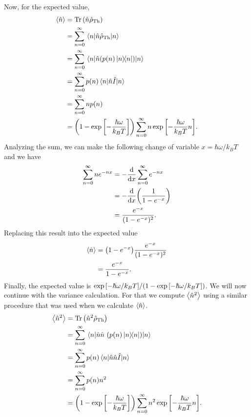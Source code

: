 \documentclass[../main.tex]{subfiles}
\begin{document}
Now, for the expected value,
\begin{align*}
    \expval{\hat{n}} &= \Tr\qty(\hat{n}\hat{\rho}_{\mathrm{Th}}) \\
                        &= \sum_{n=0}^\infty\expval{\hat{n}\hat{\rho}_{\mathrm{Th}}}{n} \\
                        &= \sum_{n=0}^\infty\expval{\hat{n}\qty(p(n) \op{n}{n})}{n} \\
                        &= \sum_{n=0}^\infty p(n)\expval{\hat{n}\hat{I}}{n} \\
                        &= \sum_{n=0}^\infty np(n) \\
                        &= \qty(1-\exp\qty[-\frac{\hbar\omega}{k_BT}])\sum_{n=0}^\infty n\exp\qty[-\frac{\hbar\omega }{k_BT}n].
\end{align*}
Analyzing the sum, we can make the following change of variable $x=\hbar\omega/k_BT$ and we have 
\begin{align*}
    \sum_{n=0}^\infty ne^{-nx} &= -\dv{x}\sum_{n=0}^\infty e^{-nx} \\
                                &=-\dv{x}\qty(\frac{1}{1-e^{-x}}) \\
                                &=\frac{e^{-x}}{(1-e^{-x})^2}.
\end{align*}
Replacing this result into the expected value
\begin{align*}
    \expval{\hat{n}} &= \qty(1-e^{-x})\frac{e^{-x}}{(1-e^{-x})^2} \\
                     &=\frac{e^{-x}}{1-e^{-x}}.
\end{align*}
Finally, the expected value is $\exp\qty[-\hbar\omega/k_BT]/(1-\exp\qty[-\hbar\omega/k_BT])$.
We will now continue with the variance calculation.
For that we compute $\expval{\hat{n}^2}$ using a similar procedure that was used when we calculate $\expval{\hat{n}}$.
\begin{align*}
    \expval{\hat{n}^2}  &= \Tr\qty(\hat{n}^2\hat{\rho}_{\mathrm{Th}}) \\
                        &= \sum_{n=0}^\infty\expval{\hat{n}\hat{n}~\qty(p(n) \op{n}{n})}{n} \\
                        &= \sum_{n=0}^\infty p(n)\expval{\hat{n}\hat{n}\hat{I}}{n} \\
                        &= \sum_{n=0}^\infty p(n)n^2 \\
                        &= \qty(1-\exp\qty[-\frac{\hbar\omega}{k_BT}])\sum_{n=0}^\infty n^2\exp\qty[-\frac{\hbar\omega }{k_BT}n].
\end{align*}
\end{document}
